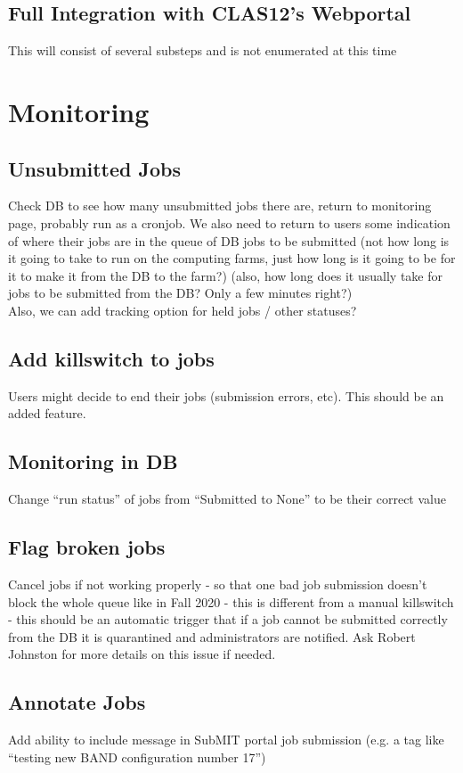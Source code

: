     \subsection{Full Integration with CLAS12's Webportal}
        This will consist of several substeps and is not enumerated at this time

\section{Monitoring}

    \subsection{Unsubmitted Jobs}
        Check DB to see how many unsubmitted jobs there are, return to monitoring page, probably run as a cronjob. We also need to return to users some indication of where their jobs are in the queue of DB jobs to be submitted (not how long is it going to take to run on the computing farms, just how long is it going to be for it to make it from the DB to the farm?) (also, how long does it usually take for jobs to be submitted from the DB? Only a few minutes right?)\\
        Also, we can add tracking option for held jobs / other statuses?
    \subsection{Add killswitch to jobs}
        Users might decide to end their jobs (submission errors, etc). This should be an added feature. 
    \subsection{Monitoring in DB}
        Change “run status” of jobs from “Submitted to None” to be their correct value
    \subsection{Flag broken jobs}
        Cancel jobs if not working properly - so that one bad job submission doesn't block the whole queue like in Fall 2020 - this is different from a manual killswitch - this should be an automatic trigger that if a job cannot be submitted correctly from the DB it is quarantined and administrators are notified. Ask Robert Johnston for more details on this issue if needed.
    \subsection{Annotate Jobs}
        Add ability to include message in SubMIT portal job submission (e.g. a tag like “testing new BAND configuration number 17”)


